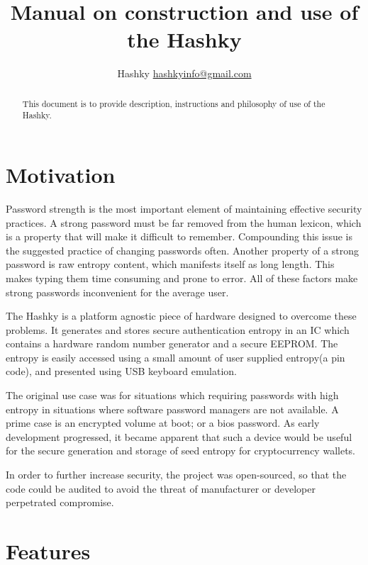 \documentclass{article}
\begin{document}
\title{Manual on construction and use of the Hashky}
\author{Hashky \href{mailto:hashkyinfo@gmail.com}{hashkyinfo@gmail.com}}
\maketitle

\begin{abstract}
This document is to provide description, instructions and philosophy of use of the Hashky. 

\end{abstract}


\section{Motivation}

Password strength is the most important element of maintaining effective security practices. A strong password must be far removed from the human lexicon, which is a property that will make it difficult to remember. Compounding this issue is the suggested practice of changing passwords often. Another property of a strong password is raw entropy content, which manifests itself as long length. This makes typing them time consuming and prone to error. All of these factors make strong passwords inconvenient for the average user.

The Hashky is a platform agnostic piece of hardware designed to overcome these problems. It generates and stores secure authentication entropy in an IC which contains a hardware random number generator and a secure EEPROM. The entropy is easily accessed using a small amount of user supplied entropy(a pin code), and presented using USB keyboard emulation.  

The original use case was for situations which requiring passwords with high entropy in situations where software password managers are not available. A prime case is an encrypted volume at boot; or a bios password. As early development progressed, it became apparent that such a device would be useful for the secure generation and storage of seed entropy for cryptocurrency wallets.  

In order to further increase security, the project was open-sourced, so that the code could be audited to avoid the threat of manufacturer or developer perpetrated compromise.  

\section{Features}
\end{document}

